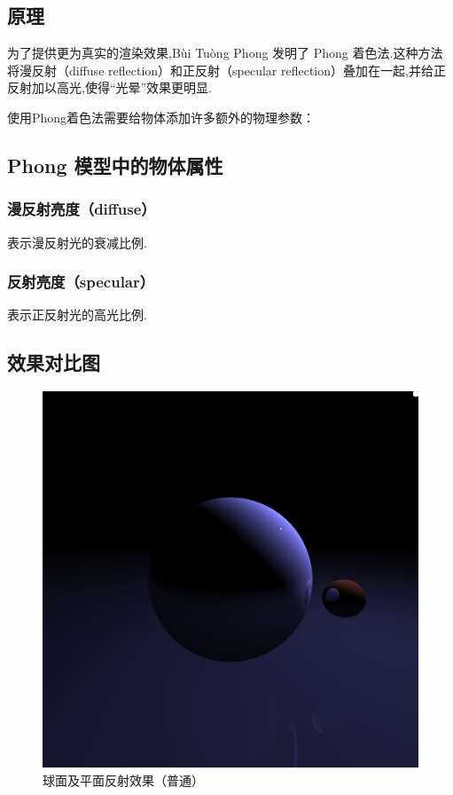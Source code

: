 \documentclass[10pt,twocolumn]{article}
\begin{document}
\subsection{\hei 原理}

为了提供更为真实的渲染效果,Bùi Tuòng Phong 发明了 Phong 着色法.这种方法将漫反射（diffuse reflection）和正反射（specular reflection）叠加在一起,并给正反射加以高光,使得“光晕”效果更明显.

使用Phong着色法需要给物体添加许多额外的物理参数：
\subsection{Phong 模型中的物体属性}
\subsubsection{\hei 漫反射亮度（diffuse）}
表示漫反射光的衰减比例.
\subsubsection{\hei 反射亮度（specular）}
表示正反射光的高光比例.

\subsection{\hei 效果对比图}
\newpage

\begin{figure}[ht]
\centering
\includegraphics[scale=.2]{fig3.jpg}
\caption{球面及平面反射效果（普通）}
\end{figure}
\end{document}

